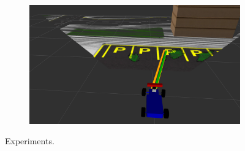 \begin{figure}[h]
\begin{subfigure}[b]{0.45\linewidth}
  \end{subfigure}
  \begin{subfigure}[b]{0.45\linewidth}
      \includegraphics[width=\linewidth]{figures/experiments/parking-slot-pc.png}
  \end{subfigure}
  \caption{Experiments.}
  \label{figure:stop}
\end{figure}
